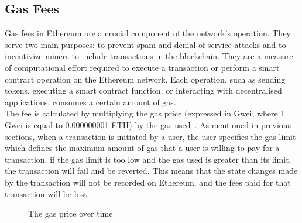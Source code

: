 \subsection{Gas Fees}
Gas fees in Ethereum are a crucial component of the network's operation. They serve two main purposes: to prevent spam and denial-of-service attacks and to incentivize miners to include transactions in the blockchain. They are a measure of computational effort required to execute a transaction or perform a smart contract operation on the Ethereum network. Each operation, such as sending tokens, executing a smart contract function, or interacting with decentralised applications, consumes a certain amount of gas.
\\[5mm]
The fee is calculated by multiplying the gas price (expressed in Gwei, where 1 Gwei is equal to 0.000000001 ETH) by the gas used~\cite{noauthor_gas_nodate}. As mentioned in previous sections, when a transaction is initiated by a user, the user specifies the gas limit which defines the maximum amount of gas that a user is willing to pay for a transaction, if the gas limit is too low and the gas used is greater than its limit, the transaction will fail and be reverted. This means that the state changes made by the transaction will not be recorded on Ethereum, and the fees paid for that transaction will be lost.

\begin{figure}[!htb]
    \centering
    \caption{The gas price over time}
    \label{fig:gwei_over_time}
\end{figure}

